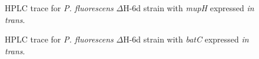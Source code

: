 		\setlength\fboxsep{5pt}
		\setlength\fboxrule{1.5pt}
		\begin{figure}[htbp]
		\centering
		\caption[HPLC trace for \textit{P. fluorescens} $ \Delta $H-6d strain with \textit{mupH} expressed \textit{in trans}. ]{HPLC trace for \textit{P. fluorescens} $ \Delta $H-6d strain with \textit{mupH} expressed \textit{in trans}.}
		\label{fig:hplcdeltahmuph}
		\end{figure}			

		\setlength\fboxsep{5pt}
		\setlength\fboxrule{1.5pt}
		\begin{figure}[htbp]
		\centering
		\caption[HPLC trace for \textit{P. fluorescens} $ \Delta $H-6d strain with \textit{batC} expressed \textit{in trans}. ]{HPLC trace for \textit{P. fluorescens} $ \Delta $H-6d strain with \textit{batC} expressed \textit{in trans}.}
		\label{fig:hplcdeltahbatc}
		\end{figure}

